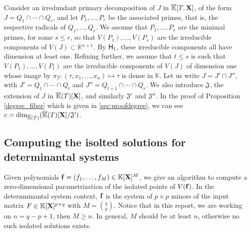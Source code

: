 \documentclass[11pt]{article}
\numberwithin{Property}{section}
\numberwithin{Theorem}{section}
\numberwithin{Proposition}{section}
\numberwithin{Lemma}{section}
\numberwithin{Corollary}{section}
\numberwithin{Definition}{section}
\numberwithin{Remark}{section}
\numberwithin{Conjecture}{section}
\numberwithin{Problem}{section}
\numberwithin{Claim}{section}
\theoremstyle{definition}
\numberwithin{Example}{section}
\renewcommand{\le}{\leqslant}
\renewcommand{\ge}{\geqslant}
\def\bar{\overline}
\renewcommand{\ge}{\geqslant} %
\renewcommand{\le}{\leqslant} %
\newcommand{\field}{\mathbb{K}} %
\newcommand{\mat}[1]{\mathbf{\MakeUppercase{#1}}} %
\newcommand{\todo}[1]{\textcolor{red}{#1}} %
\newcommand{\improve}[1]{\textcolor{blue}{#1}} %
\begin{document}
Consider an irredundant primary decomposition of $J$ in $\bar{\field}[T, \mat{X}]$, of the form $J=Q_1 \cap \cdots \cap Q_r$, and let $P_1,\dots,P_r$ be the associated primes, that is, the respective radicals of $Q_1,\dots,Q_r$. We assume that $P_1,\dots,P_s$ are the minimal primes, for some $s \le r$, so that $V(P_1), \dots,V(P_s)$ are the irreducible components of $V(J)\subset \bar{\field}{}^{n+1}$. By ${\sf H}_1$, these irreducible components all have dimension at least one. Refining further, we assume that $t \le s$ is such that $V(P_1),\dots,V(P_t)$ are the irreducible components of $V(J)$ of dimension one whose image by $\pi_T: (\tau,x_1,\dots,x_n) \mapsto \tau$ is dense in $\field$. Let us write $J=J' \cap J''$, with $J'=Q_1 \cap \cdots \cap Q_t$ and $J''=Q_{t+1} \cap \cdots \cap Q_r$. We also introduce  $\frak{J}$, the extension of $J$ in $\bar{\field}(T)[\mat{X}]$, and similarly $\frak{J}'$ and ${\frak J}''$. In the proof of Proposition \ref{degree_fiber} which is given in \improve{\cref{sec:proofdegree}}, we can see $c=\dim_{\bar{\field}(T)}(\bar{\field}(T)[\mat{X}]/{\frak J}')$.

\subsection{Computing the isolted solutions for determinantal systems}
Given polynomials ${\bf{f}} = (f_1, \ldots, f_M) \in \field[\mat{X}]^M$, we give an algorithm to compute a zero-dimensional parametrization of the isolated points of $V(\bf{f})$. In the deternminantal system context, $\bf{f}$ is the system of $p \times p$ minors of the input matrix $F \in \field[\mat{X}]^{p \times q}$ with $M = {{q}\choose{p}}$. Notice that in this report, we are working on $n = q-p+1$, then $M \ge n$. In general, $M$ should be at least $n$, otherwise no such isolated solutions exists.
\end{document}
